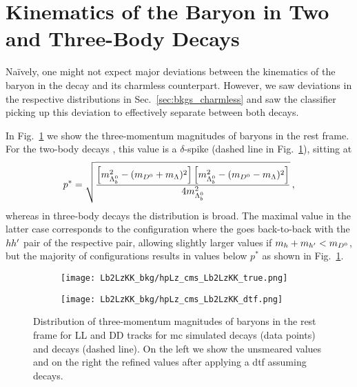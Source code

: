 \section{Kinematics of the \texorpdfstring{\Lz}{Λ} Baryon in Two and Three-Body Decays}
\label{sec:apdx_charmlessrel_Lzp}
Na\"ively, one might not expect major deviations between the kinematics of the \Lz baryon in the \decay{\Lb}{\Dz\Lz} decay and its charmless counterpart.
However, we saw deviations in the respective \pt distributions in Sec.~\ref{sec:bkgs_charmless} and saw the \Lz classifier picking up this deviation to effectively separate between both decays.

In Fig.~\ref{fig:apdx_charmlessrefl_pLz} we show the three-momentum magnitudes of \Lz baryons in the \Lb rest frame.
For the two-body decays \decay{\Lb}{\Dz\Lz}, this value is a $\delta$-spike (dashed line in Fig.~\ref{fig:apdx_charmlessrefl_pLz}), sitting at 
\begin{equation*}
    p^* = \sqrt{ \frac{ \left[ m_{{{\Lambda}^0_{b}}}^2 - (m_{{{D}^0}} + m_{{\Lambda}})^2 \right] \left[ m_{{{\Lambda}^0_{b}}}^2 - (m_{{{D}^0}} - m_{{\Lambda}})^2 \right]}{4m_{{{\Lambda}^0_{b}}}^2}} \,,
\end{equation*}
whereas in three-body decays the distribution is broad.
The maximal value in the latter case corresponds to the configuration where the \Lz goes back-to-back with the $hh'$ pair of the respective  pair, allowing slightly larger values if $m_{h} + m_{h'} < m_{{{D}^0}}$, but the majority of configurations results in values below $p^*$ as shown in Fig.~\ref{fig:apdx_charmlessrefl_pLz}.
\begin{figure}[htbp]
    \centering
    \begin{subfigure}{.49\textwidth}
        \centering
        \texttt{[image: Lb2LzKK\_bkg/hpLz\_cms\_Lb2LzKK\_true.png]}
    \end{subfigure}
    \begin{subfigure}{.49\textwidth}
        \centering
        \texttt{[image: Lb2LzKK\_bkg/hpLz\_cms\_Lb2LzKK\_dtf.png]}
    \end{subfigure}
    \caption{Distribution of three-momentum magnitudes of \Lz baryons in the \Lb rest frame for \gls{LL} and \gls{DD} tracks for \gls{mc} simulated \decay{\Lb}{\Lz\Km\Kp} decays (data points) and \decay{\Lb}{\Dz\Lz} decays (dashed line). On the left we show the unsmeared values and on the right the refined values after applying a \gls{dtf} assuming \decay{\Lb}{\Dz\Lz} decays.}
    \label{fig:apdx_charmlessrefl_pLz}
\end{figure}
